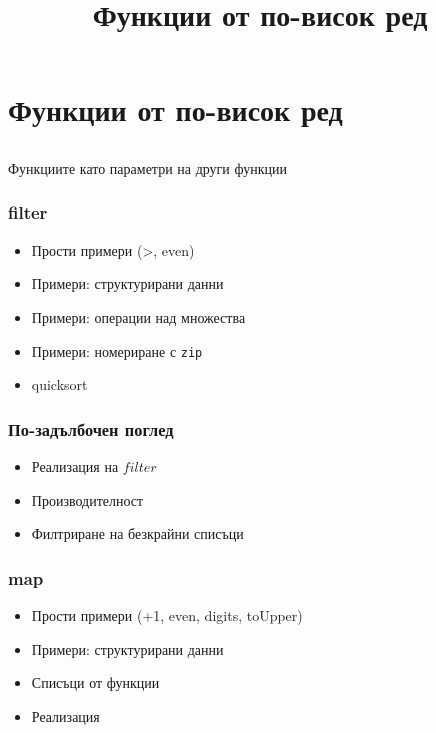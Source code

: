 \documentclass{beamer}
\begin{document}
\title[Функции от по-висок ред]{Функции от по-висок ред}
\frame{\titlepage}

\section{Функции от по-висок ред}
\subsection{}

\begin{frame}
  \centerline{Функциите като параметри на други функции}
\end{frame}

\begin{frame}[fragile]
  \frametitle{filter}

  \begin{itemize}
    \item Прости примери (>, even)
    \item Примери: структурирани данни
    \item Примери: операции над множества
    \item Примери: номериране с \verb#zip#
    \item quicksort
  \end{itemize}

\end{frame}

\begin{frame}[fragile]
  \frametitle{По-задълбочен поглед}

  \begin{itemize}
    \item Реализация на $filter$
    \item Производителност
    \item Филтриране на безкрайни списъци
  \end{itemize}

  
\end{frame}

\begin{frame}[fragile]
  \frametitle{map}

  \begin{itemize}
    \item Прости примери (+1, even, digits, toUpper)
    \item Примери: структурирани данни
    \item Списъци от функции
    \item Реализация
  \end{itemize}

\end{frame}
\end{document}

